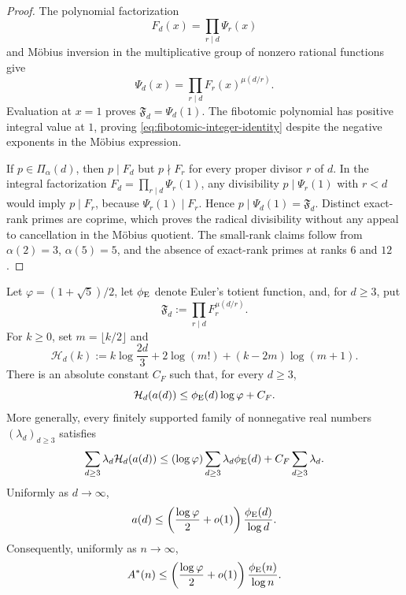 \begin{proof}
The polynomial factorization
\[
 F_d(x)=\prod_{r\mid d}\Psi_r(x)
\]
and M\"obius inversion in the multiplicative group of nonzero rational
functions give
\[
 \Psi_d(x)=\prod_{r\mid d}F_r(x)^{\mu(d/r)}.
\]
Evaluation at $x=1$ proves
$\mathfrak F_d=\Psi_d(1)$. The fibotomic polynomial has positive integral
value at $1$, proving \eqref{eq:fibotomic-integer-identity} despite the
negative exponents in the M\"obius expression.

If $p\in\Pi_\alpha(d)$, then $p\mid F_d$ but $p\nmid F_r$ for every proper
divisor $r$ of $d$. In the integral factorization
$F_d=\prod_{r\mid d}\Psi_r(1)$, any divisibility
$p\mid\Psi_r(1)$ with $r<d$ would imply $p\mid F_r$, because
$\Psi_r(1)\mid F_r$. Hence $p\mid\Psi_d(1)=\mathfrak F_d$. Distinct
exact-rank primes are coprime, which proves the radical divisibility without
any appeal to cancellation in the M\"obius quotient. The small-rank claims
follow from $\alpha(2)=3$, $\alpha(5)=5$, and the absence of exact-rank
primes at ranks $6$ and $12$.
\end{proof}

\begin{theorem}
\label{thm:fibotomic-rank-entropy}
Let $\varphi=(1+\sqrt5)/2$, let $\phi_{\rm E}$ denote Euler's totient
function, and, for $d\geq3$, put
\[
 \mathfrak F_d:=\prod_{r\mid d}F_r^{\mu(d/r)}.
\]
For $k\geq0$, set $m=\lfloor k/2\rfloor$ and
\[
 \mathcal H_d(k):=
 k\log\frac{2d}{3}+2\log(m!)+(k-2m)\log(m+1).
\]
There is an absolute constant $C_F$ such that, for every $d\geq3$,
\begin{equation}\label{eq:fibotomic-rank-entropy}
 \mathcal H_d(a(d))\leq \phi_{\rm E}(d)\log\varphi+C_F.
\end{equation}
More generally, every finitely supported family of nonnegative real numbers
$(\lambda_d)_{d\geq3}$ satisfies
\begin{equation}\label{eq:weighted-fibotomic-rank-entropy}
 \sum_{d\geq3}\lambda_d\mathcal H_d(a(d))
 \leq (\log\varphi)\sum_{d\geq3}\lambda_d\phi_{\rm E}(d)
       +C_F\sum_{d\geq3}\lambda_d.
\end{equation}
Uniformly as $d\to\infty$,
\begin{equation}\label{eq:pointwise-exact-rank-bound}
 a(d)\leq
 \left(\frac{\log\varphi}{2}+o(1)\right)
 \frac{\phi_{\rm E}(d)}{\log d}.
\end{equation}
Consequently, uniformly as $n\to\infty$,
\begin{equation}\label{eq:visible-exact-rank-bound}
 A^*(n)\leq
 \left(\frac{\log\varphi}{2}+o(1)\right)
 \frac{\phi_{\rm E}(n)}{\log n}.
\end{equation}
\end{theorem}

